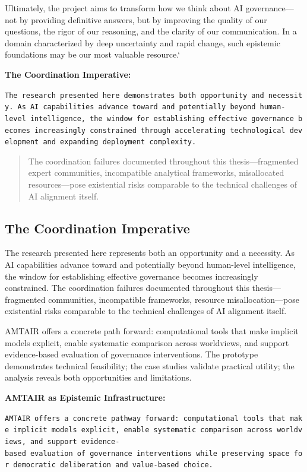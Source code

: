 \documentclass[
  11pt,
  letterpaper,
]{book}
\begin{document}
Ultimately, the project aims to transform how we think about AI
governance---not by providing definitive answers, but by improving the
quality of our questions, the rigor of our reasoning, and the clarity of
our communication. In a domain characterized by deep uncertainty and
rapid change, such epistemic foundations may be our most valuable
resource.`

\textbf{The Coordination Imperative:}

\texttt{The\ research\ presented\ here\ demonstrates\ both\ opportunity\ and\ necessity.\ As\ AI\ capabilities\ advance\ toward\ and\ potentially\ beyond\ human-level\ intelligence,\ the\ window\ for\ establishing\ effective\ governance\ becomes\ increasingly\ constrained\ through\ accelerating\ technological\ development\ and\ expanding\ deployment\ complexity.}

\begin{quote}
The coordination failures documented throughout this thesis---fragmented
expert communities, incompatible analytical frameworks, misallocated
resources---pose existential risks comparable to the technical
challenges of AI alignment itself.
\end{quote}

\subsection{The Coordination
Imperative}\label{sec-coordination-imperative}

The research presented here represents both an opportunity and a
necessity. As AI capabilities advance toward and potentially beyond
human-level intelligence, the window for establishing effective
governance becomes increasingly constrained. The coordination failures
documented throughout this thesis---fragmented communities, incompatible
frameworks, resource misallocation---pose existential risks comparable
to the technical challenges of AI alignment itself.

AMTAIR offers a concrete path forward: computational tools that make
implicit models explicit, enable systematic comparison across
worldviews, and support evidence-based evaluation of governance
interventions. The prototype demonstrates technical feasibility; the
case studies validate practical utility; the analysis reveals both
opportunities and limitations.

\textbf{AMTAIR as Epistemic Infrastructure:}

\texttt{AMTAIR\ offers\ a\ concrete\ pathway\ forward:\ computational\ tools\ that\ make\ implicit\ models\ explicit,\ enable\ systematic\ comparison\ across\ worldviews,\ and\ support\ evidence-based\ evaluation\ of\ governance\ interventions\ while\ preserving\ space\ for\ democratic\ deliberation\ and\ value-based\ choice.}
\end{document}
